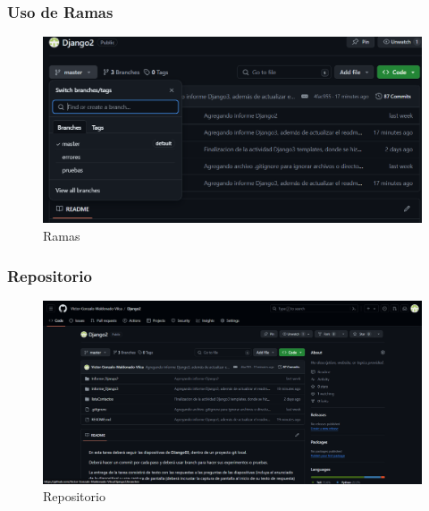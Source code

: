 \documentclass{article}
\begin{document}

  \subsubsection{Uso de Ramas}
  \begin{figure}[H]
    \centering
    \includegraphics[width=1\textwidth, keepaspectratio]{img/ramas.png}
    \caption{Ramas}
  \end{figure}
  

  \subsubsection{Repositorio}
  \begin{figure}[H]
    \centering
    \includegraphics[width=1\textwidth, keepaspectratio]{img/repositorio.png}
    \caption{Repositorio}
  \end{figure}
  
\end{document}
